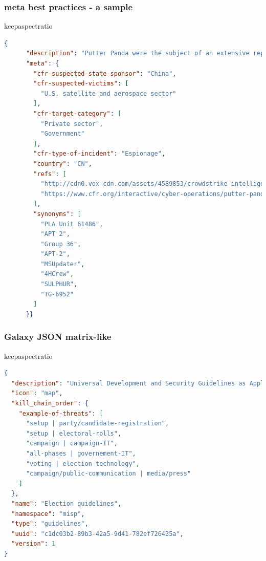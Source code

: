 \begin{frame}[fragile]
        \frametitle{meta best practices - a sample}
        \begin{adjustbox}{keepaspectratio}
          \begin{lstlisting}[language=json,firstnumber=1]
 {
      "description": "Putter Panda were the subject of an extensive report by CrowdStrike, which stated: 'The CrowdStrike Intelligence team has been tracking this particular unit since2012, under the codename PUTTER PANDA, and has documented activity dating back to 2007. The report identifies Chen Ping, aka cpyy, and the primary location of Unit 61486.'",
      "meta": {
        "cfr-suspected-state-sponsor": "China",
        "cfr-suspected-victims": [
          "U.S. satellite and aerospace sector"
        ],
        "cfr-target-category": [
          "Private sector",
          "Government"
        ],
        "cfr-type-of-incident": "Espionage",
        "country": "CN",
        "refs": [
          "http://cdn0.vox-cdn.com/assets/4589853/crowdstrike-intelligence-report-putter-panda.original.pdf",
          "https://www.cfr.org/interactive/cyber-operations/putter-panda"
        ],
        "synonyms": [
          "PLA Unit 61486",
          "APT 2",
          "Group 36",
          "APT-2",
          "MSUpdater",
          "4HCrew",
          "SULPHUR",
          "TG-6952"
        ]
      }}
          \end{lstlisting}
          \end{adjustbox}
\end{frame}

\begin{frame}[fragile]
        \frametitle{Galaxy JSON matrix-like}
        \begin{adjustbox}{keepaspectratio}
            \begin{lstlisting}[language=json,firstnumber=1]
        {
  "description": "Universal Development and Security Guidelines as Applicable to Election Technology.",
  "icon": "map",
  "kill_chain_order": {
    "example-of-threats": [
      "setup | party/candidate-registration",
      "setup | electoral-rolls",
      "campaign | campaign-IT",
      "all-phases | governement-IT",
      "voting | election-technology",
      "campaign/public-communication | media/press"
    ]
  },
  "name": "Election guidelines",
  "namespace": "misp",
  "type": "guidelines",
  "uuid": "c1dc03b2-89b3-42a5-9d41-782ef726435a",
  "version": 1
}
        \end{lstlisting}
        \end{adjustbox}
\end{frame}

